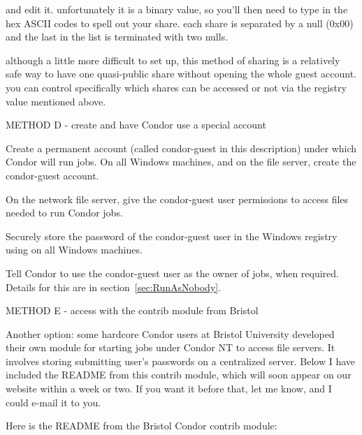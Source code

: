 and edit it.  unfortunately it is a binary value, so you'll then need to
type in the hex ASCII codes to spell out your share.  each share is
separated by a null (0x00) and the last in the list is terminated with
two nulls.

although a little more difficult to set up, this method of sharing is a
relatively safe way to have one quasi-public share without opening the
whole guest account.  you can control specifically which shares can be 
accessed or not via the registry value mentioned above.


METHOD D -  create and have Condor use a special account

Create a permanent account (called condor-guest in this description)
under which Condor will run jobs.
On all Windows machines, and on the file server, create the
condor-guest account.

On the network file server, give the condor-guest user permissions
to access files needed to run Condor jobs.

Securely store the password of the condor-guest user in the
Windows registry using  on all Windows
machines.

Tell Condor to use the condor-guest user as the owner of jobs,
when required.
Details for this are in 
section~\ref{sec:RunAsNobody}.

METHOD E -  access with the contrib module from Bristol

Another option: some hardcore Condor users at Bristol University developed 
their own module for starting jobs under Condor NT to access file 
servers.  It involves storing submitting user's passwords on a centralized 
server.  Below I have included the README from this contrib module, which 
will soon appear on our website within a week or two.  If you want it 
before that, let me know, and I could e-mail it to you.

Here is the README from the Bristol Condor contrib module:

